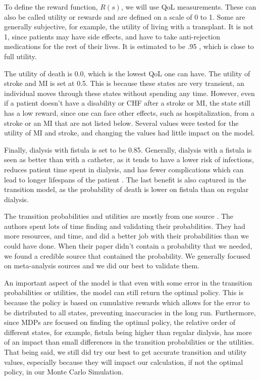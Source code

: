 \documentclass[10pt,twocolumn]{article}
\begin{document}
To define the reward function, \(R(s)\), we will use QoL measurements. These can also be called utility or rewards and are defined on a scale of 0 to 1. Some are generally subjective, for example, the utility of living with a transplant. It is not 1, since patients may have side effects, and have to take anti-rejection medications for the rest of their lives. It is estimated to be .95 \cite{ckdmodel}, which is close to full utility. 

The utility of death is 0.0, which is the lowest QoL one can have. The utility of stroke and MI is set at 0.5. This is because these states are very transient, an individual moves through these states without spending any time. However, even if a patient doesn't have a disability or CHF after a stroke or MI, the state still has a low reward, since one can face other effects, such as hospitalization, from a stroke or an MI that are not listed below. Several values were tested for the utility of MI and stroke, and changing the values had little impact on the model.

Finally, dialysis with fistula is set to be 0.85. Generally, dialysis with a fistula is seen as better than with a catheter, as it tends to have a lower risk of infections, reduces patient time spent in dialysis, and has fewer complications which can lead to longer lifespans of the patient \cite{Chronic}. The last benefit is also captured in the transition model, as the probability of death is lower on fistula than on regular dialysis.

The transition probabilities and utilities are mostly from one source \cite{ckdmodel}. The authors spent lots of time finding and validating their probabilities. They had more resources, and time, and did a better job with their probabilities than we could have done. When their paper didn't contain a probability that we needed, we found a credible source that contained the probability. We generally focused on meta-analysis sources and we did our best to validate them.

An important aspect of the model is that even with some error in the transition probabilities or utilities, the model can still return the optimal policy. This is because the policy is based on cumulative rewards which allows for the error to be distributed to all states, preventing inaccuracies in the long run. Furthermore, since MDPs are focused on finding the optimal policy, the relative order of different states, for example, fistula being higher than regular dialysis, has more of an impact than small differences in the transition probabilities or the utilities. That being said, we still did try our best to get accurate transition and utility values, especially because they will impact our calculation, if not the optimal policy, in our Monte Carlo Simulation.
\end{document}
